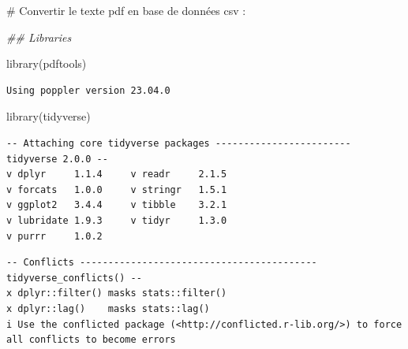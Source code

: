 \documentclass[
  letterpaper,
  DIV=11,
  numbers=noendperiod]{scrartcl}
\newenvironment{Shaded}{\begin{snugshade}}{\end{snugshade}}
\newcommand{\CommentTok}[1]{\textcolor[rgb]{0.37,0.37,0.37}{#1}}
\newcommand{\DocumentationTok}[1]{\textcolor[rgb]{0.37,0.37,0.37}{\textit{#1}}}
\newcommand{\FunctionTok}[1]{\textcolor[rgb]{0.28,0.35,0.67}{#1}}
\newcommand{\NormalTok}[1]{\textcolor[rgb]{0.00,0.23,0.31}{#1}}
\begin{document}
\begin{Shaded}
\begin{Highlighting}[]
\CommentTok{\# Convertir le texte pdf en base de données csv : }

\DocumentationTok{\#\# Libraries}

\FunctionTok{library}\NormalTok{(pdftools)}
\end{Highlighting}
\end{Shaded}

\begin{verbatim}
Using poppler version 23.04.0
\end{verbatim}

\begin{Shaded}
\begin{Highlighting}[]
\FunctionTok{library}\NormalTok{(tidyverse)}
\end{Highlighting}
\end{Shaded}

\begin{verbatim}
-- Attaching core tidyverse packages ------------------------ tidyverse 2.0.0 --
v dplyr     1.1.4     v readr     2.1.5
v forcats   1.0.0     v stringr   1.5.1
v ggplot2   3.4.4     v tibble    3.2.1
v lubridate 1.9.3     v tidyr     1.3.0
v purrr     1.0.2     
\end{verbatim}

\begin{verbatim}
-- Conflicts ------------------------------------------ tidyverse_conflicts() --
x dplyr::filter() masks stats::filter()
x dplyr::lag()    masks stats::lag()
i Use the conflicted package (<http://conflicted.r-lib.org/>) to force all conflicts to become errors
\end{verbatim}
\end{document}
